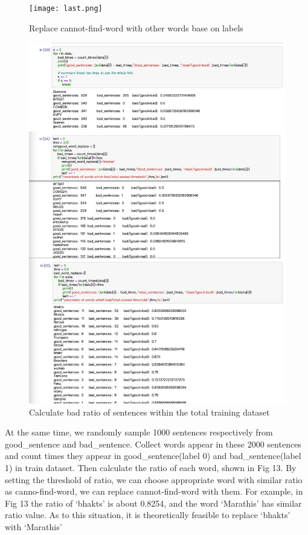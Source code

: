 \documentclass{article}
\begin{document}
\begin{figure}[H]
	\centering
	\texttt{[image: last.png]} %
	\caption{Replace cannot-find-word with other words base on labels}
\end{figure}
\begin{figure}[H] %
	\centering
	\includegraphics[scale = 0.2]{insert.jpeg}
	\caption{Calculate bad ratio of sentences within the total training dataset}
\end{figure}
\noindent At the same time, we randomly sample 1000 sentences respectively from good\_sentence and bad\_sentence. Collect words appear in these 2000 sentences and count times they appear in good\_sentence(label 0) and bad\_sentence(label 1) in train dataset. Then calculate the ratio of each word, shown in Fig 13. By setting the threshold of ratio, we can choose appropriate word with similar ratio as canno-find-word, we can replace cannot-find-word with them. For example, in Fig 13 the ratio of ‘bhakts’ is about 0.8254, and the word ‘Marathis’ has similar ratio value. As to this situation, it is theoretically feasible to replace ‘bhakts’ with ‘Marathis’\\
\end{document}
